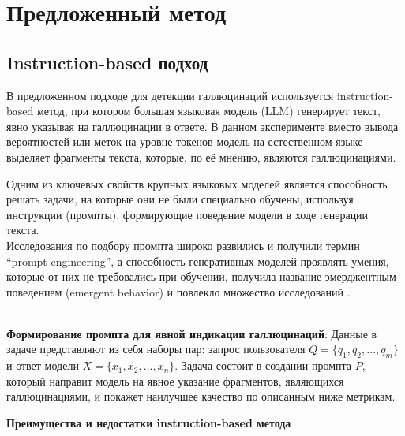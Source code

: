 \documentclass[12pt]{article}
\begin{document}
\section{Предложенный метод}
\subsection{Instruction-based подход}
В предложенном подходе для детекции галлюцинаций используется instruction-based метод, при котором большая языковая модель (LLM) генерирует текст, явно указывая на галлюцинации в ответе. В данном эксперименте вместо вывода вероятностей или меток на уровне токенов модель на естественном языке выделяет фрагменты текста, которые, по её мнению, являются галлюцинациями.

Одним из ключевых свойств крупных языковых моделей является способность решать задачи, на которые они не были специально обучены, используя инструкции (промпты), формирующие поведение модели в ходе генерации текста. \\
Исследования по подбору промпта широко развились \cite{reynolds2021promptprogramminglargelanguage, liu2021pretrainpromptpredictsystematic} и получили термин ``prompt engineering'', а способность генеративных моделей проявлять умения, которые от них не требовались при обучении, получила название эмерджентным поведением (emergent behavior) и повлекло множество исследований \cite{wei2022emergentabilitieslargelanguage, openai2024gpt4technicalreport}.

\\
\textbf{Формирование промпта для явной индикации галлюцинаций}:
   Данные в задаче представляют из себя наборы пар: запрос пользователя \( Q = \{q_1, q_2, \dots, q_m\} \) и ответ модели \( X = \{x_1, x_2, \dots, x_n\} \). Задача состоит в создании промпта \( P \), который направит модель на явное указание фрагментов, являющихся галлюцинациями, и покажет наилучшее качество по описанным ниже метрикам.
   
\textbf{Преимущества и недостатки instruction-based метода}
\end{document}
